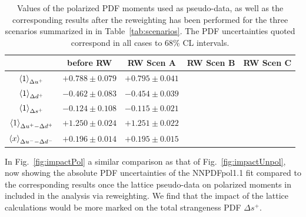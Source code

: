 \begin{table}[h]
\centering
\begin{tabular}{c|c|c|c|c}
  \hline &  before RW  & RW Scen A  &  RW Scen B  & RW Scen C  \\
  \hline
  $\left\langle 1\right\rangle_{\Delta u^+}$    &  $+0.788\pm  0.079$   &  $+0.795 \pm  0.041$    &     &   \\
   $\left\langle 1\right\rangle_{\Delta d^+}$   &  $-0.462 \pm 0.083$  &   $-0.454\pm  0.039$  &     &   \\
  $\left\langle 1\right\rangle_{\Delta s^+}$    &  $-0.124\pm   0.108 $  & $ -0.115 \pm 0.021$    &     &   \\
  $\left\langle 1\right\rangle_{\Delta u^+ - \Delta d^+}$  & $+1.250 \pm 0.024$   & $+1.251 \pm 0.022 $    &     &   \\
  $\left\langle x\right\rangle_{\Delta u^--\Delta d^-}$     & $+0.196 \pm 0.014$    &  $+0.195 \pm  0.015$   &     &   \\
  \hline
\end{tabular}
\caption{\small Values of the polarized PDF moments
  used as pseudo-data, as well as the corresponding results
  after the reweighting has been performed for the
three scenarios summarized in 
in Table~\ref{tab:scenarios}.
%
The PDF uncertainties quoted correspond in all cases to 68\%
CL intervals.
\label{tab:polmomentsrw}
}
\end{table}

In Fig.~\ref{fig:impactPol} a
similar comparison as that of Fig.~\ref{fig:impactUnpol}, now
  showing the absolute PDF uncertainties of the NNPDFpol1.1 fit
  compared to the corresponding results once the lattice pseudo-data
  on polarized moments in included in the analysis via
  reweighting.
  We find that the impact of the lattice calculations
  would be more marked on the total
  strangeness PDF $\Delta s^+$.
  
